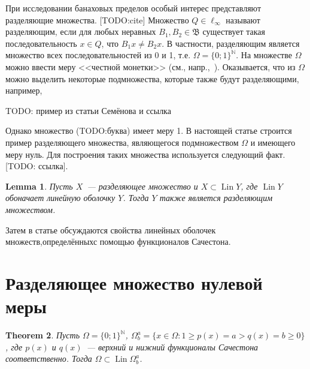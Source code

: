 \documentclass[a4paper,14pt]{article} %
\theoremstyle{plain}
\newtheorem{theorem}{Theorem}[section]
\newtheorem{lemma}[theorem]{Lemma}
\theoremstyle{definition}
\begin{document}
При исследовании банаховых пределов особый интерес представляют разделяющие множества.
[TODO:cite]
Множество $Q\in\ell_\infty$ называют разделяющим, если
для любых неравных $B_1,B_2\in\mathfrak{B}$ существует такая последовательность $x\in Q$,
что $B_1 x \neq B_2 x$.
В частности, разделяющим является множество всех последовательностей из 0 и 1, т.е.
$\Omega=\{0;1\}^\mathbb{N}$.
На множестве $\Omega$ можно ввести меру <<честной монетки>> (см., напр.,~\cite{connor1990almost}).
Оказывается, что из $\Omega$ можно выделить некоторые подмножества, которые также будут разделяющими,
например,

TODO: пример из статьи Семёнова и ссылка

Однако множество (TODO:буква) имеет меру 1.
В настоящей статье строится пример разделяющего множества,
являющегося подмножеством $\Omega$ и имеющего меру нуль.
Для построения таких множества используется следующий факт.
[TODO: ссылка].
\begin{lemma}
	Пусть $X$~--- разделяющее множество и $X \subset \operatorname{Lin} Y$,
	где $\operatorname{Lin} Y$ обоначает линейную оболочку $Y$.
	Тогда $Y$ также является разделяющим множеством.
\end{lemma}
Затем в статье обсуждаются свойства линейных оболочек множеств,определённыхс помощью функционалов Сачестона.

\section{Разделяющее множество нулевой меры}

\begin{theorem}
	\label{thm:Lin_Omega_Sucheston}
	Пусть $\Omega = \{0;1\}^\mathbb{N}$,
	$\Omega^a_b = \{x\in\Omega : 1 \geq p(x) = a > q(x) = b \geq 0\}$,
	где $p(x)$ и $q(x)$~--- верхний и нижний функционалы Сачестона~\cite{sucheston1967banach} соответственно.
	Тогда $\Omega \subset \operatorname{Lin} \Omega^a_b$.
\end{theorem}
\end{document}
